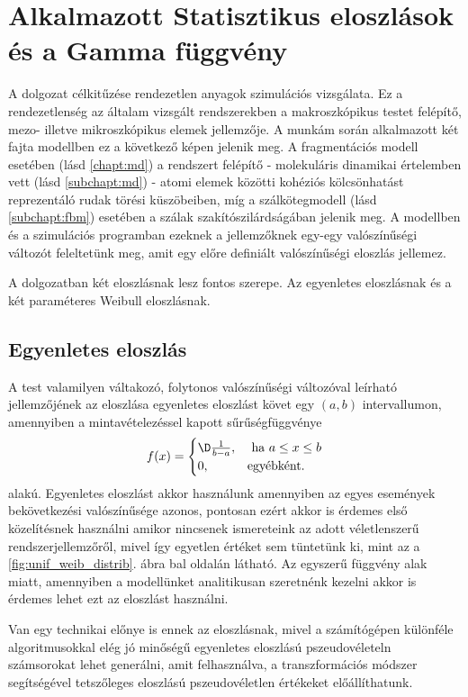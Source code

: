 \section{Alkalmazott Statisztikus eloszlások és a Gamma függvény}
\label{sec:functions_gamma}
A dolgozat célkitűzése rendezetlen anyagok szimulációs vizsgálata. Ez a rendezetlenség az általam vizsgált rendszerekben a makroszkópikus testet felépítő, mezo- illetve mikroszkópikus elemek jellemzője. A munkám során alkalmazott két fajta modellben ez a következő képen jelenik meg. A fragmentációs modell esetében (lásd \ref{chapt:md}) a rendszert felépítő - molekuláris dinamikai értelemben vett (lásd \ref{subchapt:md}) - atomi elemek közötti kohéziós kölcsönhatást reprezentáló rudak törési küszöbeiben, míg a szálkötegmodell (lásd \ref{subchapt:fbm}) esetében a szálak szakítószilárdságában jelenik meg. A modellben és a szimulációs programban ezeknek a jellemzőknek egy-egy valószínűségi változót feleltetünk meg, amit egy előre definiált valószínűségi eloszlás jellemez.

A dolgozatban két eloszlásnak lesz fontos szerepe. Az egyenletes eloszlásnak és a két paraméteres Weibull eloszlásnak.

\subsection{Egyenletes eloszlás}
A test valamilyen váltakozó, folytonos valószínűségi változóval \cite{distribution_valseg} leírható jellemzőjének az eloszlása egyenletes eloszlást követ egy $(a,b)$ intervallumon, amennyiben a mintavételezéssel kapott sűrűségfüggvénye
\begin{equation}
	f(x)= 
	\begin{cases}
		\D \frac{1}{b-a}, & \mbox{ ha } a\leq x\leq b \\
		0, & \mbox{egyébként.}
	\end{cases}
\end{equation}
alakú.
Egyenletes eloszlást akkor használunk amennyiben az egyes események bekövetkezési valószínűsége azonos, pontosan ezért akkor is érdemes első közelítésnek használni amikor nincsenek ismereteink az adott véletlenszerű rendszerjellemzőről, mivel így egyetlen értéket sem tüntetünk ki, mint az a \ref{fig:unif_weib_distrib}. ábra bal oldalán látható. Az egyszerű függvény alak miatt, amennyiben a modellünket analitikusan szeretnénk kezelni akkor is érdemes lehet ezt az eloszlást használni.

Van egy technikai előnye is ennek az eloszlásnak, mivel a számítógépen különféle algoritmusokkal elég jó minőségű egyenletes eloszlású pszeudovéleteln számsorokat lehet generálni, amit felhasználva, a transzformációs módszer segítségével \cite{comphys_woolfsonpert1999} tetszőleges eloszlású pszeudovéletlen értékeket előállíthatunk.

